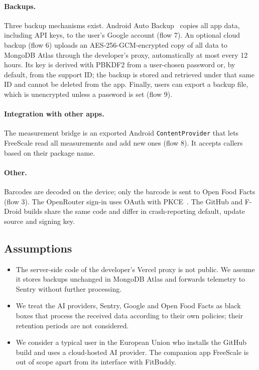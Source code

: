 \paragraph{Backups.} Three backup mechanisms exist. Android Auto Backup~\cite{android-autobackup}
copies all app data, including API keys, to the user's Google account (flow 7). An optional
cloud backup (flow 6) uploads an AES-256-GCM-encrypted copy of all data to MongoDB Atlas through
the developer's proxy, automatically at most every 12 hours. Its key is derived with PBKDF2 from
a user-chosen password or, by default, from the support ID; the backup is stored and retrieved
under that same ID and cannot be deleted from the app. Finally, users can export a backup file,
which is unencrypted unless a password is set (flow 9).

\paragraph{Integration with other apps.} The measurement bridge is an exported Android
\texttt{ContentProvider} that lets FreeScale read all measurements and add new ones (flow 8). It
accepts callers based on their package name.

\paragraph{Other.} Barcodes are decoded on the device; only the barcode is sent to Open Food Facts
(flow 3). The OpenRouter sign-in uses OAuth with PKCE~\cite{openrouter-oauth}. The GitHub and
F-Droid builds share the same code and differ in crash-reporting default, update source and
signing key.

\subsection{Assumptions}
\begin{itemize}
  \item The server-side code of the developer's Vercel proxy is not public. We assume it stores
        backups unchanged in MongoDB Atlas and forwards telemetry to Sentry without further
        processing.
  \item We treat the AI providers, Sentry, Google and Open Food Facts as black boxes that process
        the received data according to their own policies; their retention periods are not
        considered.
  \item We consider a typical user in the European Union who installs the GitHub build and uses a
        cloud-hosted AI provider. The companion app FreeScale is out of scope apart from its
        interface with FitBuddy.
\end{itemize}
